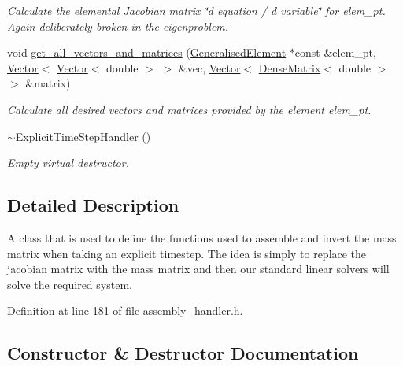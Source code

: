 \begin{DoxyCompactItemize}
\begin{DoxyCompactList}\small\item\em Calculate the elemental Jacobian matrix \char`\"{}d equation 
/ d variable\char`\"{} for elem\+\_\+pt. Again deliberately broken in the eigenproblem. \end{DoxyCompactList}\item 
void \hyperlink{classoomph_1_1ExplicitTimeStepHandler_a842529121fbe177ea6900d668d8b2a65}{get\+\_\+all\+\_\+vectors\+\_\+and\+\_\+matrices} (\hyperlink{classoomph_1_1GeneralisedElement}{Generalised\+Element} $\ast$const \&elem\+\_\+pt, \hyperlink{classoomph_1_1Vector}{Vector}$<$ \hyperlink{classoomph_1_1Vector}{Vector}$<$ double $>$ $>$ \&vec, \hyperlink{classoomph_1_1Vector}{Vector}$<$ \hyperlink{classoomph_1_1DenseMatrix}{Dense\+Matrix}$<$ double $>$ $>$ \&matrix)
\begin{DoxyCompactList}\small\item\em Calculate all desired vectors and matrices provided by the element elem\+\_\+pt. \end{DoxyCompactList}\item 
\hyperlink{classoomph_1_1ExplicitTimeStepHandler_a183f40bf18428256a5097f95560f7c5e}{$\sim$\+Explicit\+Time\+Step\+Handler} ()
\begin{DoxyCompactList}\small\item\em Empty virtual destructor. \end{DoxyCompactList}\end{DoxyCompactItemize}


\subsection{Detailed Description}
A class that is used to define the functions used to assemble and invert the mass matrix when taking an explicit timestep. The idea is simply to replace the jacobian matrix with the mass matrix and then our standard linear solvers will solve the required system. 

Definition at line 181 of file assembly\+\_\+handler.\+h.



\subsection{Constructor \& Destructor Documentation}
\mbox{\label{classoomph_1_1ExplicitTimeStepHandler_a8519d4a06eeeb23280daa29f72f93318}} 
